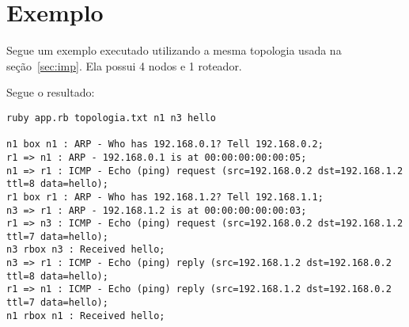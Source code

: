 \section{Exemplo}

Segue um exemplo executado utilizando a mesma topologia usada na
seção~\ref{sec:imp}. Ela possui 4 nodos e 1 roteador.

Segue o resultado:

\begin{lstlisting}
ruby app.rb topologia.txt n1 n3 hello

n1 box n1 : ARP - Who has 192.168.0.1? Tell 192.168.0.2;
r1 => n1 : ARP - 192.168.0.1 is at 00:00:00:00:00:05;
n1 => r1 : ICMP - Echo (ping) request (src=192.168.0.2 dst=192.168.1.2 ttl=8 data=hello);
r1 box r1 : ARP - Who has 192.168.1.2? Tell 192.168.1.1;
n3 => r1 : ARP - 192.168.1.2 is at 00:00:00:00:00:03;
r1 => n3 : ICMP - Echo (ping) request (src=192.168.0.2 dst=192.168.1.2 ttl=7 data=hello);
n3 rbox n3 : Received hello;
n3 => r1 : ICMP - Echo (ping) reply (src=192.168.1.2 dst=192.168.0.2 ttl=8 data=hello);
r1 => n1 : ICMP - Echo (ping) reply (src=192.168.1.2 dst=192.168.0.2 ttl=7 data=hello);
n1 rbox n1 : Received hello;
\end{lstlisting}
